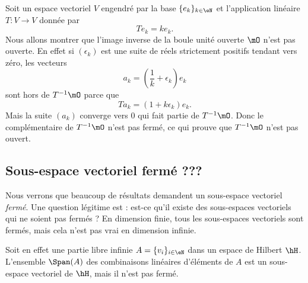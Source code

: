 \begin{example}
    Soit un espace vectoriel \( V\) engendré par la base \( \{ e_k \}_{k\in \eN}\) et l'application linéaire \( T\colon V\to V\) donnée par
    \begin{equation}
        Te_k=ke_k.
    \end{equation}
    Nous allons montrer que l'image inverse de la boule unité ouverte \( \mO\) n'est pas ouverte. En effet si \( (\epsilon_k)\) est une suite de réels strictement positifs tendant vers zéro, les vecteurs
    \begin{equation}
        a_k=\left( \frac{1}{ k }+\epsilon_k \right)e_k
    \end{equation}
    sont hors de \( T^{-1}\mO\) parce que
    \begin{equation}
        Ta_k=(1+k\epsilon_k)e_k.
    \end{equation}
    Mais la suite \( (a_k)\) converge vers \( 0\) qui fait partie de \( T^{-1}\mO\). Donc le complémentaire de \( T^{-1}\mO\) n'est pas fermé, ce qui prouve que \( T^{-1}\mO\) n'est pas ouvert.
\end{example}

\subsection{Sous-espace vectoriel fermé ???}

Nous verrons que beaucoup de résultats demandent un sous-espace vectoriel \emph{fermé}. Une question légitime est : est-ce qu'il existe des sous-espaces vectoriels qui ne soient pas fermés ? En dimension finie, tous les sous-espaces vectoriels sont fermés, mais cela n'est pas vrai en dimension infinie.

Soit en effet une partie libre infinie \( A=\{ v_i \}_{i\in \eN}\) dans un espace de Hilbert \( \hH\). L'ensemble $\Span(A)$ des combinaisons linéaires d'éléments de \( A\) est un sous-espace vectoriel de \( \hH\), mais il n'est pas fermé.

